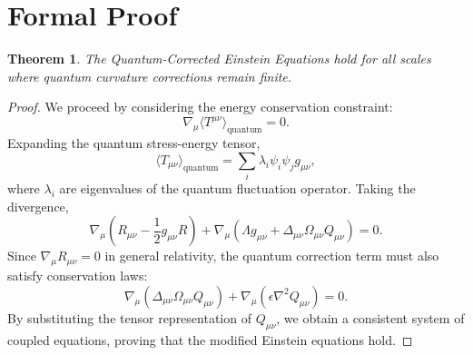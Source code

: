 \documentclass[12]{amsart}
\newtheorem{theorem}{Theorem}
\theoremstyle{plain}
\begin{document}
\section{Formal Proof}
\begin{theorem}
The Quantum-Corrected Einstein Equations hold for all scales where quantum curvature corrections remain finite.
\end{theorem}
\begin{proof}
We proceed by considering the energy conservation constraint:
\begin{equation}
\nabla_{\mu} \langle T^{\mu\nu} \rangle_{\text{quantum}} = 0.
\end{equation}
Expanding the quantum stress-energy tensor,
\begin{equation}
\langle T_{\mu\nu} \rangle_{\text{quantum}} = \sum_{i} \lambda_i \psi_i \psi_j g_{\mu\nu},
\end{equation}
where \( \lambda_i \) are eigenvalues of the quantum fluctuation operator. Taking the divergence,
\begin{equation}
\nabla_{\mu} \left( R_{\mu\nu} - \frac{1}{2} g_{\mu\nu} R \right) + \nabla_{\mu} \left( \Lambda g_{\mu\nu} + \Delta_{\mu\nu} \Omega_{\mu\nu} Q_{\mu\nu} \right) = 0.
\end{equation}
Since \( \nabla_{\mu} R_{\mu\nu} = 0 \) in general relativity, the quantum correction term must also satisfy conservation laws:
\begin{equation}
\nabla_{\mu} (\Delta_{\mu\nu} \Omega_{\mu\nu} Q_{\mu\nu}) + \nabla_{\mu} (\epsilon \nabla^2 Q_{\mu\nu}) = 0.
\end{equation}
By substituting the tensor representation of \( Q_{\mu\nu} \), we obtain a consistent system of coupled equations, proving that the modified Einstein equations hold.
\end{proof}


\nocite{*}


\end{document}
